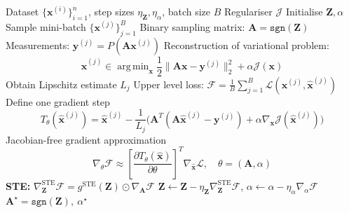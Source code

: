 \documentclass[lettersize,journal]{IEEEtran}
\providecommand{\BA}{{\mathbf A}}
\providecommand{\BZ}{{\mathbf Z}}
\providecommand{\Bx}{{\mathbf x}}
\providecommand{\By}{{\mathbf y}}
\DeclareMathOperator*{\argmin}{arg\,min}
\begin{document}
\begin{algorithm}[t]
\caption{Bilevel Optimisation of Binary Sampling Matrices}
\label{alg:bilevel_opt}
\begin{algorithmic}[1]
\REQUIRE Dataset $\{\Bx^{(i)}\}_{i=1}^{n}$, step sizes $\eta_{\BZ},\eta_{\alpha}$, batch size $B$
\REQUIRE Regulariser $\mathcal{J}$
\STATE Initialise $\BZ,\alpha$
\STATE Sample mini-batch $\{ \Bx^{(j)} \}_{j=1}^B$
\STATE Binary sampling matrix: $\BA = \texttt{sgn}(\BZ)$
\STATE Measurements: $\By^{(j)} = P(\BA \Bx^{(j)})$
\STATE Reconstruction of variational problem:
\[
\hat{\Bx}^{(j)} \in 
\argmin_{\Bx} 
\frac{1}{2}\|\BA\Bx-\By^{(j)}\|_2^2 + \alpha \mathcal{J}(\Bx)
\]
\STATE Obtain Lipschitz estimate $L_j$
\ENDFOR
\STATE Upper level loss: $\mathcal{F}=\frac1B\sum_{j=1}^B\mathcal{L}(\Bx^{(j)},\hat{\Bx}^{(j)})$
\STATE Define one gradient step
{ \small
\[
T_{\theta}(\hat{\Bx}^{(j)}) =
\hat{\Bx}^{(j)} -
\frac{1}{L_j}
\Big(
\BA^T(\BA\hat{\Bx}^{(j)}-\By^{(j)}) + \alpha \nabla_{\Bx}\mathcal{J}(\hat{\Bx}^{(j)})
\Big)
\]}
\STATE Jacobian-free gradient approximation
\[
\nabla_{\theta}\mathcal{F}
\approx
\left[
\frac{\partial T_{\theta}(\hat{\Bx})}{\partial \theta}
\right]^T
\nabla_{\hat{\Bx}}\mathcal{L},
\quad
\theta=(\BA,\alpha)
\]
\STATE \textbf{STE:} $\nabla_{\BZ}^{\text{STE}}\mathcal{F}=g^{\text{STE}}(\BZ)\odot\nabla_{\BA}\mathcal{F}$
\STATE $\BZ\leftarrow\BZ-\eta_{\BZ}\nabla_{\BZ}^{\text{STE}}\mathcal{F}$,\quad
$\alpha\leftarrow\alpha-\eta_{\alpha}\nabla_{\alpha}\mathcal{F}$
\ENDWHILE
\RETURN $\BA^\star=\texttt{sgn}(\BZ),\ \alpha^\star$
\end{algorithmic}
\end{algorithm}
\end{document}
